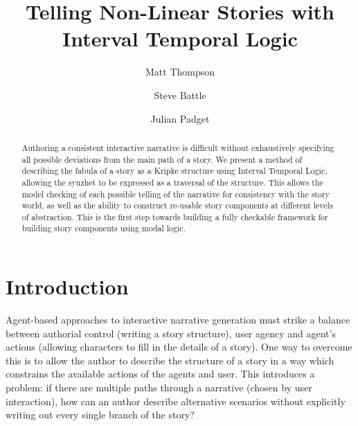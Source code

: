 \documentclass{llncs}
\begin{document}

\title{Telling Non-Linear Stories with Interval Temporal Logic}

\author{Matt Thompson \and Steve Battle \and Julian Padget }

\maketitle



\begin{abstract}
  Authoring a consistent interactive narrative is difficult without exhaustively specifying all possible deviations from the main path of a story.
We present a method of describing the fabula of a story as a Kripke structure using Interval Temporal Logic, allowing the syuzhet to be expressed as a traversal of the structure. This allows the model checking of each possible telling of the narrative for consistency with the story world, as well as the ability to construct re-usable story components at different levels of abstraction. This is the first step towards building a fully checkable framework for building story components using modal logic.
\end{abstract}

\section{Introduction}
Agent-based approaches to interactive narrative generation must strike a balance between authorial control (writing a story structure), user agency and agent's actions (allowing characters to fill in the details of a story). One way to overcome this is to allow the author to describe the structure of a story in a way which constrains the available actions of the agents and user.
This introduces a problem: if there are multiple paths through a narrative (chosen by user interaction), how can an author describe alternative scenarios without explicitly writing out every single branch of the story? 
\end{document}
